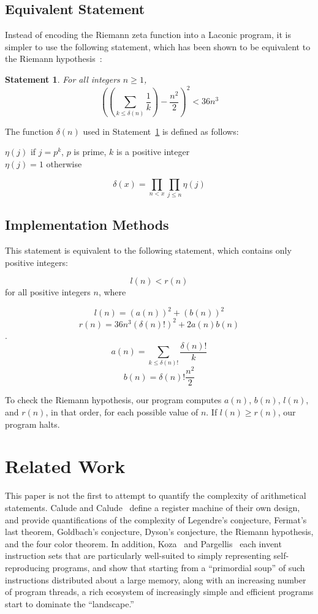 \documentclass[11pt]{article}
\newtheorem{statement}{Statement}
\newenvironment{nscenter}
 {\parskip=0pt\par\nopagebreak\centering}
 {\par\noindent\ignorespacesafterend}
\begin{document}
\subsection{Equivalent Statement}

Instead of encoding the Riemann zeta function into a Laconic program, it is simpler to use the following statement, which has been shown to be equivalent to the Riemann hypothesis~\cite{riemann}:\\

\begin{statement} \label{eq:riemann}
For all integers $n \ge 1$, 
$$\left(\left(\sum_{k \le \delta(n)} \frac{1}{k}\right) - \frac{n^2}{2}\right)^2 < 36n^3$$
\end{statement}

The function $\delta(n)$ used in Statement~\ref{eq:riemann} is defined as follows: \\

\begin{nscenter}
$\eta(j)$ if $j = p^k$, $p$ is prime, $k$ is a positive integer \\
$\eta(j) = 1$ otherwise
\end{nscenter}
$$\delta(x) = \prod_{n<x}\prod_{j \le n} \eta(j)$$

\subsection{Implementation Methods}

This statement is equivalent to the following statement, which contains only positive integers:

$$l(n) < r(n)$$ for all positive integers $n$, where

$$l(n) = (a(n))^2 + (b(n))^2$$
$$r(n) = 36n^3(\delta(n)!)^2 + 2a(n)b(n)$$.
$$a(n) = \sum_{k \le \delta(n)!} \frac{\delta(n)!}{k}$$
$$b(n) = \delta(n)!\frac{n^2}{2}$$

To check the Riemann hypothesis, our program computes $a(n)$, $b(n)$, $l(n)$, and $r(n)$, in that order, for each possible value of $n$. If $l(n) \ge r(n)$, our program halts.

\section{Related Work}

This paper is not the first to attempt to quantify the complexity of arithmetical statements. Calude and Calude~\cite{calude} define a register machine of their own design, and provide quantifications of the complexity of Legendre's conjecture, Fermat's last theorem, Goldbach's conjecture, Dyson's conjecture, the Riemann hypothesis, and the four color theorem. In addition, Koza~\cite{koza} and Pargellis~\cite{pargellis} each invent instruction sets that are particularly well-suited to simply representing self-reproducing programs, and show that starting from a ``primordial soup'' of such instructions distributed about a large memory, along with an increasing number of program threads, a rich ecosystem of increasingly simple and efficient programs start to dominate the ``landscape.'' \\
\end{document}
